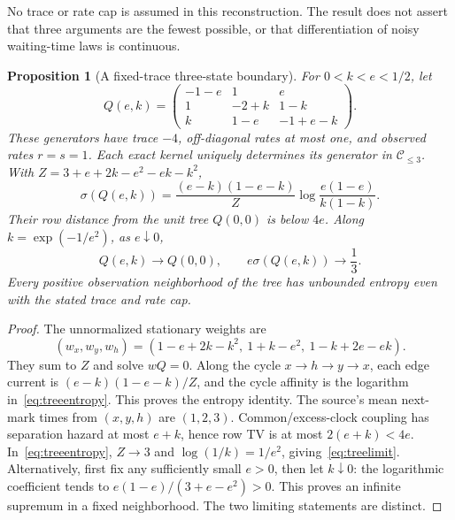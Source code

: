 \documentclass[aps,pre,onecolumn,11pt,longbibliography,notitlepage]{revtex4-2}
\newtheorem{proposition}[theorem]{Proposition}
\newcommand{\1}{\mathbf 1}
\newcommand{\C}{\mathcal C}
\newcommand{\sig}{\sigma}
\begin{document}
No trace or rate cap is assumed in this reconstruction. The result does not assert that three arguments are the fewest possible, or that differentiation of noisy waiting-time laws is continuous.

\begin{proposition}[A fixed-trace three-state boundary]\label{prop:tree}
For $0<k<e<1/2$, let
\begin{equation}
 Q(e,k)=\begin{pmatrix}
 -1-e&1&e\\1&-2+k&1-k\\k&1-e&-1+e-k
 \end{pmatrix}.\label{eq:treefamily}
\end{equation}
These generators have trace $-4$, off-diagonal rates at most one, and observed rates $r=s=1$. Each exact kernel uniquely determines its generator in $\C_{\le3}$. With $Z=3+e+2k-e^2-ek-k^2$,
\begin{equation}
 \sig(Q(e,k))=\frac{(e-k)(1-e-k)}{Z}
 \log\frac{e(1-e)}{k(1-k)}.\label{eq:treeentropy}
\end{equation}
Their row distance from the unit tree $Q(0,0)$ is below $4e$. Along $k=\exp(-1/e^2)$, as $e\downarrow0$,
\begin{equation}
 Q(e,k)\longrightarrow Q(0,0),\qquad e\sig(Q(e,k))\longrightarrow\frac13.\label{eq:treelimit}
\end{equation}
Every positive observation neighborhood of the tree has unbounded entropy even with the stated trace and rate cap.
\end{proposition}

\begin{proof}
The unnormalized stationary weights are
\begin{equation}
 (w_x,w_y,w_h)=(1-e+2k-k^2,\ 1+k-e^2,\ 1-k+2e-ek).
\end{equation}
They sum to $Z$ and solve $wQ=0$. Along the cycle $x\to h\to y\to x$, each edge current is $(e-k)(1-e-k)/Z$, and the cycle affinity is the logarithm in~\eqref{eq:treeentropy}. This proves the entropy identity. The source's mean next-mark times from $(x,y,h)$ are $(1,2,3)$. Common/excess-clock coupling has separation hazard at most $e+k$, hence row TV is at most $2(e+k)<4e$. In~\eqref{eq:treeentropy}, $Z\to3$ and $\log(1/k)=1/e^2$, giving~\eqref{eq:treelimit}. Alternatively, first fix any sufficiently small $e>0$, then let $k\downarrow0$: the logarithmic coefficient tends to $e(1-e)/(3+e-e^2)>0$. This proves an infinite supremum in a fixed neighborhood. The two limiting statements are distinct.
\end{proof}
\end{document}
